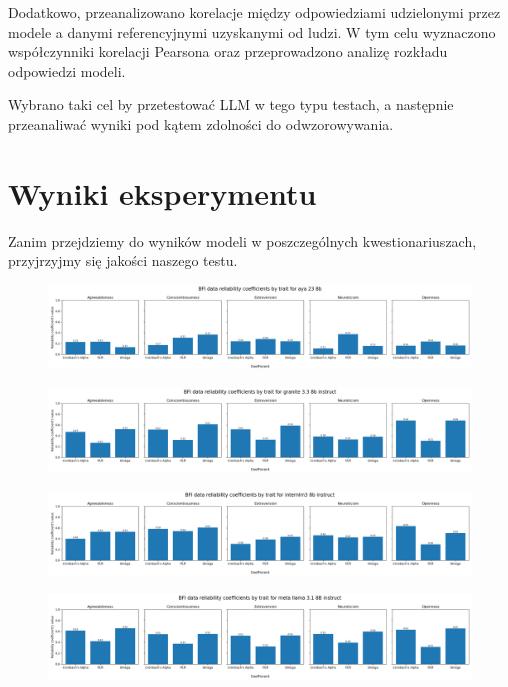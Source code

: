 \documentclass{article}
\begin{document}
Dodatkowo, przeanalizowano korelacje między odpowiedziami udzielonymi przez modele a danymi referencyjnymi uzyskanymi od ludzi. W tym celu wyznaczono współczynniki korelacji Pearsona oraz przeprowadzono analizę rozkładu odpowiedzi modeli.

Wybrano taki cel by przetestować LLM w tego typu testach, a następnie przeanaliwać wyniki pod kątem zdolności do odwzorowywania.

\section{Wyniki eksperymentu}
Zanim przejdziemy do wyników modeli w poszczególnych kwestionariuszach, przyjrzyjmy się jakości naszego testu.

\begin{figure}[H]
    \centering
    \includegraphics[width=0.7 \linewidth]{../Prompt_code/plots/aya-23-8b/bfi_reliability.png}
\end{figure}

\begin{figure}[H]
    \centering
    \includegraphics[width=0.7 \linewidth]{../Prompt_code/plots/granite-3.3-8b-instruct/bfi_reliability.png}
\end{figure}

\begin{figure}[H]
    \centering
    \includegraphics[width=0.7 \linewidth]{../Prompt_code/plots/internlm3-8b-instruct/bfi_reliability.png}
\end{figure}

\begin{figure}[H]
    \centering
    \includegraphics[width=0.7 \linewidth]{../Prompt_code/plots/meta-llama-3.1-8B-instruct/bfi_reliability.png}
\end{figure}
\end{document}
